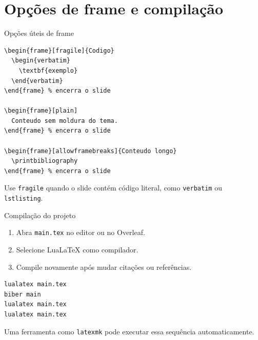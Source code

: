 \section{Opções de frame e compilação}

\begin{frame}[fragile]{Opções úteis de frame}
\begin{lstlisting}
\begin{frame}[fragile]{Codigo}
  \begin{verbatim}
    \textbf{exemplo}
  \end{verbatim}
\end{frame} % encerra o slide

\begin{frame}[plain]
  Conteudo sem moldura do tema.
\end{frame} % encerra o slide

\begin{frame}[allowframebreaks]{Conteudo longo}
  \printbibliography
\end{frame} % encerra o slide
\end{lstlisting}

Use \verb|fragile| quando o slide contém código literal, como \verb|verbatim| ou \verb|lstlisting|.
\end{frame}

\begin{frame}[fragile]{Compilação do projeto}
\begin{enumerate}
    \item Abra \texttt{main.tex} no editor ou no Overleaf.
    \item Selecione LuaLaTeX como compilador.
    \item Compile novamente após mudar citações ou referências.
\end{enumerate}

\begin{lstlisting}
lualatex main.tex
biber main
lualatex main.tex
lualatex main.tex
\end{lstlisting}

Uma ferramenta como \texttt{latexmk} pode executar essa sequência automaticamente.
\end{frame}

